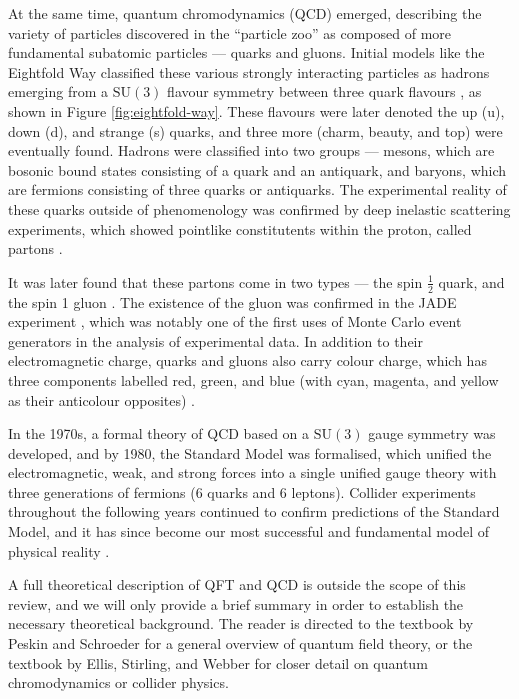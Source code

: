 \documentclass[12pt,a4paper]{report}
\begin{document}
At the same time, quantum chromodynamics (QCD) emerged, describing the variety of particles discovered in the ``particle zoo'' as composed of more fundamental subatomic particles --- quarks and gluons. Initial models like the Eightfold Way classified these various strongly interacting particles as hadrons emerging from a $\text{SU}(3)$ flavour symmetry between three quark flavours \cite{Neeman:1961jhl,Gell-Mann:1962yej}, as shown in Figure \ref{fig:eightfold-way}. These flavours were later denoted the up (u), down (d), and strange (s) quarks, and three more (charm, beauty, and top) were eventually found. Hadrons were classified into two groups --- mesons, which are bosonic bound states consisting of a quark and an antiquark, and baryons, which are fermions consisting of three quarks or antiquarks. The experimental reality of these quarks outside of phenomenology was confirmed by deep inelastic scattering experiments, which showed pointlike constitutents within the proton, called partons \cite{thomson_modern_2013,ellis_qcd_1996}.

It was later found that these partons come in two types --- the spin $\frac{1}{2}$ quark, and the spin 1 gluon \cite{navas_review_2024}. The existence of the gluon was confirmed in the JADE experiment \cite{JADE:1979rke}, which was notably one of the first uses of Monte Carlo event generators in the analysis of experimental data. In addition to their electromagnetic charge, quarks and gluons also carry colour charge, which has three components labelled red, green, and blue (with cyan, magenta, and yellow as their anticolour opposites) \cite{thomson_modern_2013,navas_review_2024}.

In the 1970s, a formal theory of QCD based on a $\text{SU}(3)$ gauge symmetry was developed, and by 1980, the Standard Model was formalised, which unified the electromagnetic, weak, and strong forces into a single unified gauge theory with three generations of fermions (6 quarks and 6 leptons). Collider experiments throughout the following years continued to confirm predictions of the Standard Model, and it has since become our most successful and fundamental model of physical reality \cite{thomson_modern_2013, schwartz_quantum_2014}.

A full theoretical description of QFT and QCD is outside the scope of this review, and we will only provide a brief summary in order to establish the necessary theoretical background. The reader is directed to the textbook by Peskin and Schroeder \cite{Peskin:1995ev} for a general overview of quantum field theory, or the textbook by Ellis, Stirling, and Webber \cite{ellis_qcd_1996} for closer detail on quantum chromodynamics or collider physics.
\end{document}
